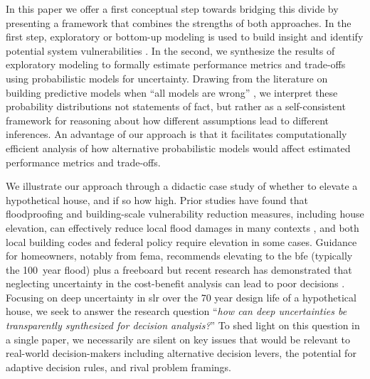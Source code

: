 \documentclass{agujournal2019}
\begin{document}
In this paper we offer a first conceptual step towards bridging this divide by presenting a framework that combines the strengths of both approaches.
In the first step, exploratory or bottom-up modeling is used to build insight and identify potential system vulnerabilities \cite{moallemi_exploratory:2020,bankes:1993,brown_decisionscaling:2012}.
In the second, we synthesize the results of exploratory modeling to formally estimate performance metrics and trade-offs using probabilistic models for uncertainty.
Drawing from the literature on building predictive models when ``all models are wrong'' \cite{box_sciencestatistics:1976,gelman_philosophy:2013,Piironen:2017eh}, we interpret these probability distributions not statements of fact, but rather as a self-consistent framework for reasoning about how different assumptions lead to different inferences.
An advantage of our approach is that it facilitates computationally efficient analysis of how alternative probabilistic models would affect estimated performance metrics and trade-offs.

We illustrate our approach through a didactic case study of whether to elevate a hypothetical house, and if so how high.
Prior studies have found that floodproofing and building-scale vulnerability reduction measures, including house elevation, can effectively reduce local flood damages in many contexts \cite{demoel_reducing:2014,deruig_building:2020,kreibich_building:2005,slotter_floodproofing:2020,rozer_coping:2016,mobley_mitigation:2020,aerts_cost:2018}, and both local building codes \cite{asce_7-10:2013,bruneau_multihazard:2017,asce_24-05:2006} and federal policy \cite{FEMA_p-55:2011} require elevation in some cases.
Guidance for homeowners, notably from \gls{fema}, recommends elevating to the \gls{bfe} (typically the \SI{100}{year} flood) plus a freeboard \cite{fema_retrofitting:2014,asce_24-14:2015,fema_retrofitting:2014} but recent research has demonstrated that neglecting uncertainty in the cost-benefit analysis can lead to poor decisions \cite{zarekarizi_suboptimal:2020}.
Focusing on deep uncertainty in \gls{slr} over the 70 year design life of a hypothetical house, we seek to answer the research question ``\emph{how can deep uncertainties be transparently synthesized for decision analysis?}''
To shed light on this question in a single paper, we necessarily are silent on key issues that would be relevant to real-world decision-makers including alternative decision levers, the potential for adaptive decision rules, and rival problem framings.
\end{document}
